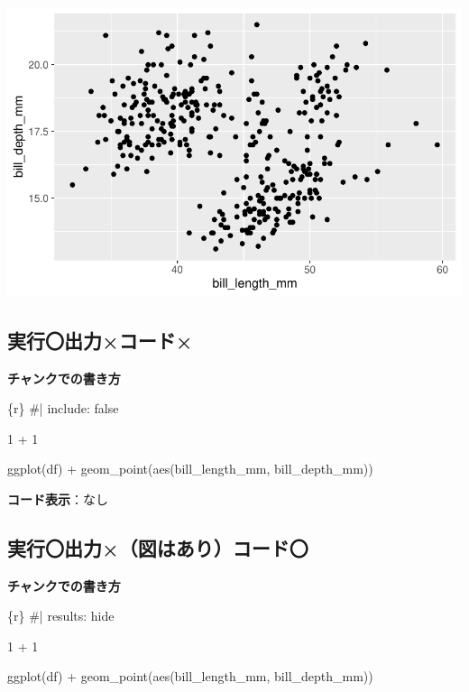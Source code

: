 \documentclass[
  b5paper,
  xelatex, ja=standard]{bxjsbook}
\newenvironment{Shaded}{\begin{snugshade}}{\end{snugshade}}
\newcommand{\InformationTok}[1]{\textcolor[rgb]{0.37,0.37,0.37}{#1}}
\begin{document}
\includegraphics{basic_files/figure-pdf/unnamed-chunk-4-1.pdf}

\subsection{実行〇\textbar 出力×\textbar コード×}

\textbf{チャンクでの書き方}

\begin{Shaded}
\begin{Highlighting}[]
\InformationTok{\textasciigrave{}\textasciigrave{}\textasciigrave{}\{r\}}
\InformationTok{\#| include: false}

\InformationTok{1 + 1}


\InformationTok{ggplot(df) +}
\InformationTok{  geom\_point(aes(bill\_length\_mm, bill\_depth\_mm))}
\InformationTok{\textasciigrave{}\textasciigrave{}\textasciigrave{}}
\end{Highlighting}
\end{Shaded}

\textbf{コード表示}：なし

\subsection{実行〇\textbar 出力×（図はあり）\textbar コード〇}

\textbf{チャンクでの書き方}

\begin{Shaded}
\begin{Highlighting}[]
\InformationTok{\textasciigrave{}\textasciigrave{}\textasciigrave{}\{r\}}
\InformationTok{\#| results: hide}

\InformationTok{1 + 1}


\InformationTok{ggplot(df) +}
\InformationTok{  geom\_point(aes(bill\_length\_mm, bill\_depth\_mm))}
\InformationTok{\textasciigrave{}\textasciigrave{}\textasciigrave{}}
\end{Highlighting}
\end{Shaded}
\end{document}
